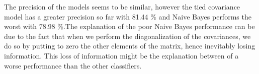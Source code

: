 \documentclass[twoside,a4paper,12pt]{report}
\begin{document}
The precision of the models seems to be similar, however the tied covariance model has a greater precision so far with 81.44 \% and Naive Bayes performs the worst with 78.98 \%.The explanation of the poor Naive Bayes performance can be due to the fact that when we perform the diagonalization of the covariances, we do so by putting to zero the other elements of the matrix, hence inevitably losing information. This loss of information might be the explanation between of a worse performance than the other classifiers.  
\end{document}
